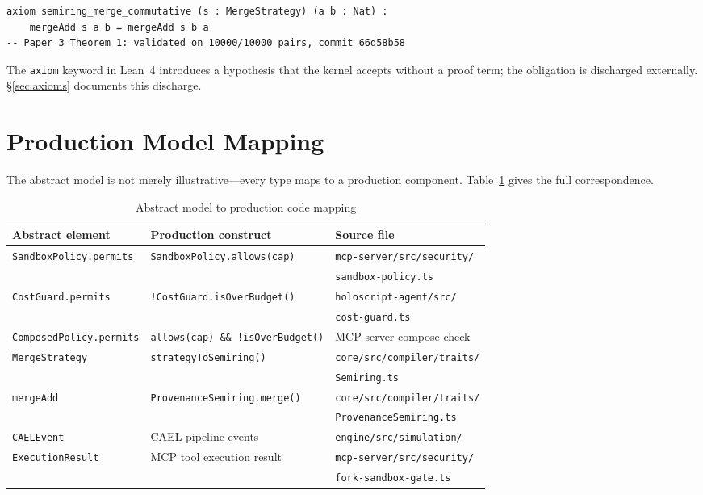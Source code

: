\documentclass[sigconf]{acmart}
\begin{document}
\begin{lstlisting}[language=Lean4,caption={Semiring axiom (externally validated)}]
axiom semiring_merge_commutative (s : MergeStrategy) (a b : Nat) :
    mergeAdd s a b = mergeAdd s b a
-- Paper 3 Theorem 1: validated on 10000/10000 pairs, commit 66d58b58
\end{lstlisting}

\noindent
The \texttt{axiom} keyword in Lean~4 introduces a hypothesis that the kernel
accepts without a proof term; the obligation is discharged externally.
\S\ref{sec:axioms} documents this discharge.

\section{Production Model Mapping}
\label{sec:mapping}

The abstract model is not merely illustrative---every type maps to a
production component.  Table~\ref{tab:mapping} gives the full correspondence.

\begin{table}[t]
\caption{Abstract model to production code mapping}
\label{tab:mapping}
\small
\begin{tabular}{lll}
\toprule
Abstract element & Production construct & Source file \\
\midrule
\texttt{SandboxPolicy.permits}  & \texttt{SandboxPolicy.allows(cap)} &
  \texttt{mcp-server/src/security/}\\
  & & \quad\texttt{sandbox-policy.ts} \\[2pt]
\texttt{CostGuard.permits}      & \texttt{!CostGuard.isOverBudget()} &
  \texttt{holoscript-agent/src/}\\
  & & \quad\texttt{cost-guard.ts} \\[2pt]
\texttt{ComposedPolicy.permits} & \texttt{allows(cap) \&\& !isOverBudget()} &
  MCP server compose check \\[2pt]
\texttt{MergeStrategy}          & \texttt{strategyToSemiring()} &
  \texttt{core/src/compiler/traits/}\\
  & & \quad\texttt{Semiring.ts} \\[2pt]
\texttt{mergeAdd}               & \texttt{ProvenanceSemiring.merge()} &
  \texttt{core/src/compiler/traits/}\\
  & & \quad\texttt{ProvenanceSemiring.ts} \\[2pt]
\texttt{CAELEvent}              & CAEL pipeline events &
  \texttt{engine/src/simulation/} \\[2pt]
\texttt{ExecutionResult}        & MCP tool execution result &
  \texttt{mcp-server/src/security/}\\
  & & \quad\texttt{fork-sandbox-gate.ts} \\
\bottomrule
\end{tabular}
\end{table}
\end{document}
